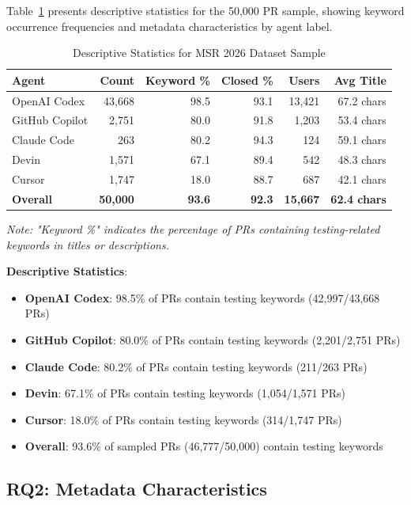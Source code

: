 \documentclass[conference]{IEEEtran}
\begin{document}
Table~\ref{tab:main_results} presents descriptive statistics for the 50,000 PR sample, showing keyword occurrence frequencies and metadata characteristics by agent label.

\begin{table}[H]
\centering
\caption{Descriptive Statistics for MSR 2026 Dataset Sample}
\label{tab:main_results}
\begin{tabular}{@{}lrrrrr@{}}
\toprule
\textbf{Agent} & \textbf{Count} & \textbf{Keyword \%} & \textbf{Closed \%} & \textbf{Users} & \textbf{Avg Title} \\
\midrule
OpenAI Codex & 43,668 & 98.5 & 93.1 & 13,421 & 67.2 chars \\
GitHub Copilot & 2,751 & 80.0 & 91.8 & 1,203 & 53.4 chars \\
Claude Code & 263 & 80.2 & 94.3 & 124 & 59.1 chars \\
Devin & 1,571 & 67.1 & 89.4 & 542 & 48.3 chars \\
Cursor & 1,747 & 18.0 & 88.7 & 687 & 42.1 chars \\
\midrule
\textbf{Overall} & \textbf{50,000} & \textbf{93.6} & \textbf{92.3} & \textbf{15,667} & \textbf{62.4 chars} \\
\bottomrule
\end{tabular}
\end{table}

\noindent \textit{Note: "Keyword \%" indicates the percentage of PRs containing testing-related keywords in titles or descriptions.}

\textbf{Descriptive Statistics}:
\begin{itemize}
    \item \textbf{OpenAI Codex}: 98.5\% of PRs contain testing keywords (42,997/43,668 PRs)
    \item \textbf{GitHub Copilot}: 80.0\% of PRs contain testing keywords (2,201/2,751 PRs)
    \item \textbf{Claude Code}: 80.2\% of PRs contain testing keywords (211/263 PRs)
    \item \textbf{Devin}: 67.1\% of PRs contain testing keywords (1,054/1,571 PRs)
    \item \textbf{Cursor}: 18.0\% of PRs contain testing keywords (314/1,747 PRs)
    \item \textbf{Overall}: 93.6\% of sampled PRs (46,777/50,000) contain testing keywords
\end{itemize}

\subsection{RQ2: Metadata Characteristics}
\end{document}
